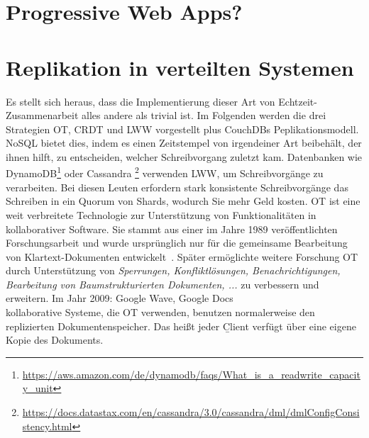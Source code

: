 \section{Progressive Web Apps?}
%
%
\section{Replikation in verteilten Systemen}
Es stellt sich heraus, dass die Implementierung dieser Art von Echtzeit-Zusammenarbeit alles andere als trivial ist.
Im Folgenden werden die drei Strategien \gls{OT}, \gls{CRDT} und \gls{LWW} vorgestellt plus CouchDBs Peplikationsmodell.
%
%
  NoSQL bietet dies, indem es einen Zeitstempel von irgendeiner Art beibehält, der ihnen hilft, zu entscheiden, welcher Schreibvorgang zuletzt kam. Datenbanken wie DynamoDB\footnote{\url{https://aws.amazon.com/de/dynamodb/faqs/What_is_a_readwrite_capacity_unit}} oder Cassandra \footnote{\url{https://docs.datastax.com/en/cassandra/3.0/cassandra/dml/dmlConfigConsistency.html}} verwenden LWW, um Schreibvorgänge zu verarbeiten. Bei diesen Leuten erfordern stark konsistente Schreibvorgänge das Schreiben in ein Quorum von Shards, wodurch Sie mehr Geld kosten.
%
%
    \gls{OT} ist eine weit verbreitete Technologie zur Unterstützung von Funktionalitäten in \gls{kollaborativ}er Software. Sie stammt aus einer im Jahre 1989 veröffentlichten Forschungsarbeit und wurde ursprünglich nur für die gemeinsame Bearbeitung von Klartext-Dokumenten entwickelt~\cite{ot_paper}. Später ermöglichte weitere Forschung \gls{OT} durch Unterstützung von \textit{Sperrungen, Konfliktlösungen, Benachrichtigungen, Bearbeitung von Baumstrukturierten Dokumenten, ...} zu verbessern und erweitern. Im Jahr 2009: Google Wave, Google Docs\\
      \Gls{kollaborativ}e Systeme, die \gls{OT} verwenden, benutzen normalerweise den replizierten Dokumentenspeicher. Das heißt jeder \b{Client} verfügt über eine eigene Kopie des Dokuments.
